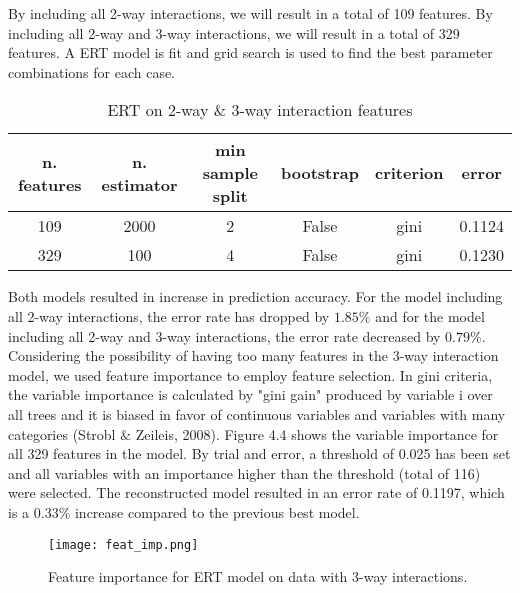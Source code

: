 \documentclass[11pt]{article}
\begin{document}
\noindent By including all 2-way interactions, we will result in a total of 109 features. By including all 2-way and 3-way interactions, we will result in a total of 329 features. A ERT model is fit and grid search is used to find the best parameter combinations for each case.

\begin{table}[ht]
    \label{interaction_both}
    \centering
    \begin{tabular}{c|c c c c|c}
        \hline
        \textbf{n. features} & \textbf{n. estimator} & \textbf{min sample split} & \textbf{bootstrap} & \textbf{criterion} & \textbf{error} \\ \hline
        109 & 2000 & 2 & False & gini & 0.1124 \\
        329 & 100 & 4 & False & gini & 0.1230 \\
        \hline
    \end{tabular}
    \caption{ERT on 2-way $\&$ 3-way interaction features}
\end{table}

\noindent Both models resulted in increase in prediction accuracy. For the model including all 2-way interactions, the error rate has dropped by $1.85\%$ and for the model including all 2-way and 3-way interactions, the error rate decreased by $0.79\%$.\\

\noindent Considering the possibility of having too many features in the 3-way interaction model, we used feature importance to employ feature selection. In gini criteria, the variable importance is calculated by "gini gain" produced by variable i over all trees and it is biased in favor of continuous variables and variables with many categories (Strobl $\&$ Zeileis, 2008). Figure 4.4 shows the variable importance for all 329 features in the model. By trial and error, a threshold of 0.025 has been set and all variables with an importance higher than the threshold (total of 116) were selected. The reconstructed model resulted in an error rate of 0.1197, which is a $0.33\%$ increase compared to the previous best model.

\begin{figure}[ht]
\label{feat_imp}
\begin{center}
\texttt{[image: feat\_imp.png]}
\end{center}
\caption{Feature importance for ERT model on data with 3-way interactions.}
\end{figure}
\end{document}

